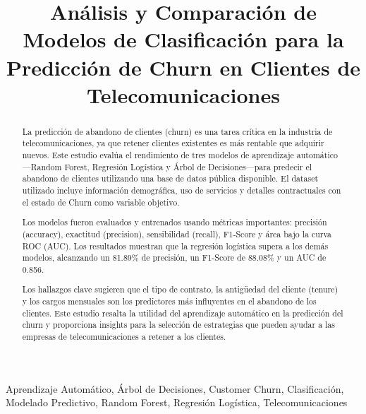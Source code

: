\documentclass[conference]{IEEEtran}
\begin{document}
\title{Análisis y Comparación de Modelos de Clasificación para la Predicción de Churn en Clientes de Telecomunicaciones}

\author{
}

\maketitle

\begin{abstract}
	La predicción de abandono de clientes (churn) es una tarea crítica en la industria de telecomunicaciones, ya que retener clientes existentes es más rentable que adquirir nuevos. Este estudio evalúa el rendimiento de tres modelos de aprendizaje automático—Random Forest, Regresión Logística y Árbol de Decisiones—para predecir el abandono de clientes utilizando una base de datos pública disponible. El dataset utilizado incluye información demográfica, uso de servicios y detalles contractuales con el estado de Churn como variable objetivo.

	Los modelos fueron evaluados y entrenados usando métricas importantes: precisión (accuracy), exactitud (precision), sensibilidad (recall), F1-Score y área bajo la curva ROC (AUC). Los resultados muestran que la regresión logística supera a los demás modelos, alcanzando un 81.89\% de precisión, un F1-Score de 88.08\% y un AUC de 0.856.

	Los hallazgos clave sugieren que el tipo de contrato, la antigüedad del cliente (tenure) y los cargos mensuales son los predictores más influyentes en el abandono de los clientes. Este estudio resalta la utilidad del aprendizaje automático en la predicción del churn y proporciona insights para la selección de estrategias que pueden ayudar a las empresas de telecomunicaciones a retener a los clientes.
\end{abstract}

\begin{IEEEkeywords}
	Aprendizaje Automático, Árbol de Decisiones, Customer Churn, Clasificación, Modelado Predictivo, Random Forest, Regresión Logística, Telecomunicaciones
\end{IEEEkeywords}
\end{document}
